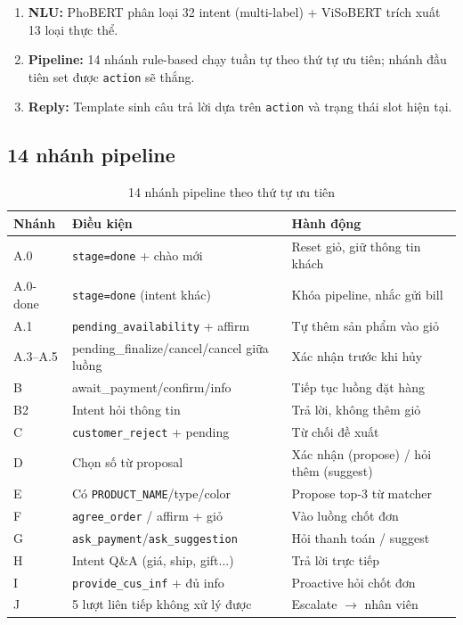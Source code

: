 \documentclass[12pt, a4paper]{report}
\begin{document}
\begin{enumerate}
  \item \textbf{NLU:} PhoBERT phân loại 32 intent (multi-label) +
        ViSoBERT trích xuất 13 loại thực thể.
  \item \textbf{Pipeline:} 14 nhánh rule-based chạy tuần tự theo thứ tự ưu tiên;
        nhánh đầu tiên set được \texttt{action} sẽ thắng.
  \item \textbf{Reply:} Template sinh câu trả lời dựa trên \texttt{action}
        và trạng thái slot hiện tại.
\end{enumerate}

\subsection{14 nhánh pipeline}

\begin{table}[H]
\centering
\caption{14 nhánh pipeline theo thứ tự ưu tiên}
\label{tab:pipeline}
\begin{tabularx}{\linewidth}{llX}
\toprule
\textbf{Nhánh} & \textbf{Điều kiện} & \textbf{Hành động} \\
\midrule
A.0      & \texttt{stage=done} + chào mới     & Reset giỏ, giữ thông tin khách \\
A.0-done & \texttt{stage=done} (intent khác)  & Khóa pipeline, nhắc gửi bill \\
A.1      & \texttt{pending\_availability} + affirm & Tự thêm sản phẩm vào giỏ \\
A.3--A.5 & pending\_finalize/cancel/cancel giữa luồng & Xác nhận trước khi hủy \\
B        & await\_payment/confirm/info        & Tiếp tục luồng đặt hàng \\
B2       & Intent hỏi thông tin               & Trả lời, không thêm giỏ \\
C        & \texttt{customer\_reject} + pending & Từ chối đề xuất \\
D        & Chọn số từ proposal                & Xác nhận (propose) / hỏi thêm (suggest) \\
E        & Có \texttt{PRODUCT\_NAME}/type/color & Propose top-3 từ matcher \\
F        & \texttt{agree\_order} / affirm + giỏ & Vào luồng chốt đơn \\
G        & \texttt{ask\_payment}/\texttt{ask\_suggestion} & Hỏi thanh toán / suggest \\
H        & Intent Q\&A (giá, ship, gift...)   & Trả lời trực tiếp \\
I        & \texttt{provide\_cus\_inf} + đủ info & Proactive hỏi chốt đơn \\
J        & 5 lượt liên tiếp không xử lý được & Escalate $\rightarrow$ nhân viên \\
\bottomrule
\end{tabularx}
\end{table}
\end{document}

